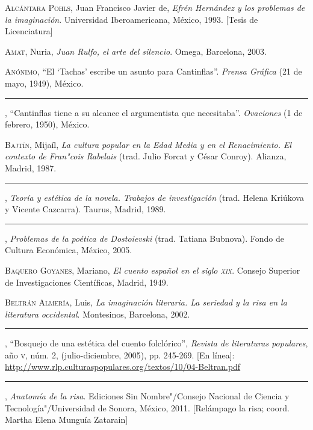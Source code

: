 \documentclass[14pt,twoside,final]{extbook} %
\begin{document}
\textsc{Alcántara Pohls}, Juan Francisco Javier de, \emph{Efrén Hernández y los problemas de la imaginación}. Universidad Iberoamericana, México, 1993. [Tesis de Licenciatura]\label{bib:alcantara1993}

\textsc{Amat}, Nuria, \emph{Juan Rulfo, el arte del silencio}. Omega, Barcelona, 2003.\label{bib:amat2003}

\textsc{Anónimo}, ``El `Tachas' escribe un asunto para Cantinflas''. \emph{Prensa Gráfica} (21 de mayo, 1949), México.\label{bib:anonimo1949}

\rule{1cm}{0.4pt}, ``Cantinflas tiene a su alcance el argumentista que necesitaba''. \emph{Ovaciones} (1 de febrero, 1950), México.\label{bib:anonimo1950}

\textsc{Bajtín}, Mijaíl, \emph{La cultura popular en la Edad Media y en el Renacimiento. El contexto de Fran"cois Rabelais} (trad. Julio Forcat y César Conroy). Alianza, Madrid, 1987.\label{bib:bajtin1987}

\rule{1cm}{0.4pt}, \emph{Teoría y estética de la novela. Trabajos de investigación} (trad. Helena Kriúkova y Vicente Cazcarra). Taurus, Madrid, 1989.\label{bib:bajtin1989}

\rule{1cm}{0.4pt}, \emph{Problemas de la poética de Dostoievski} (trad. Tatiana Bubnova). Fondo de Cultura Económica, México, 2005.\label{bib:bajtin2005}

\textsc{Baquero Goyanes}, Mariano, \emph{El cuento español en el siglo \textsc{xix}}. Consejo Superior de Investigaciones Científicas, Madrid, 1949.\label{bib:baquero1949}

\textsc{Beltrán Almería}, Luis, \emph{La imaginación literaria. La seriedad y la risa en la literatura occidental}. Montesinos, Barcelona, 2002.\label{bib:beltran2002}

\rule{1cm}{0.4pt}, ``Bosquejo de una estética del cuento folclórico'', \emph{Revista de literaturas populares}, año \textsc{v}, núm. 2, (julio-diciembre, 2005), pp. 245-269. [En línea]: \url{http://www.rlp.culturaspopulares.org/textos/10/04-Beltran.pdf}\label{bib:beltran2005}

\rule{1cm}{0.4pt}, \emph{Anatomía de la risa}. Ediciones Sin Nombre"/Consejo Nacional de Ciencia y Tecnología"/Universidad de Sonora, México, 2011. [Relámpago la risa; coord. Martha Elena Munguía Zatarain]\label{bib:beltran2011}
\end{document}
